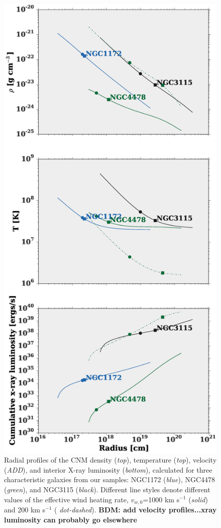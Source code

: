 \documentclass[usenatbib,fleqn]{mn2e}
\begin{document}

\begin{figure}
  \includegraphics[width=\columnwidth]{profiles.eps}
  \caption{\label{fig:profiles}Radial profiles of the CNM density
    ({\it top}), temperature ({\it top}), velocity ({\it ADD}), and
    interior X-ray luminosity ({\it bottom}), calculated for three
    characteristic galaxies from our samples: NGC1172 ({\it blue}),
    NGC4478 ({\it green}), and NGC3115 ({\it black}).  Different line
    styles denote different values of the effective wind heating rate,
    $v_{w,0}$=1000 km s$^{-1}$ ({\it solid}) and 200 km s$^{-1}$ ({\it
      dot-dashed}).  {\bf BDM: add velocity profiles...xray luminosity
      can probably go elsewhere}}
\end{figure}
\end{document}
